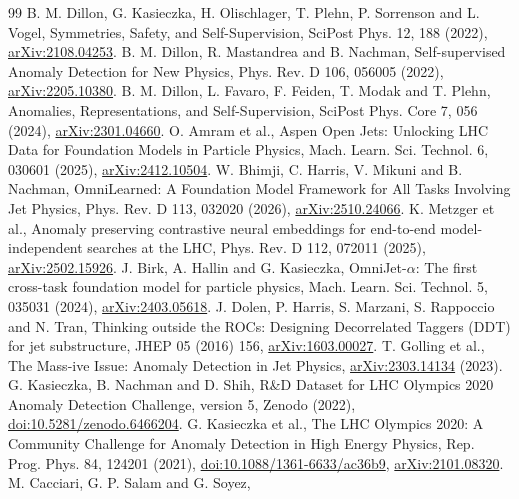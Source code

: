 \begin{thebibliography}{99}
 B. M. Dillon, G. Kasieczka, H. Olischlager, T. Plehn, P. Sorrenson and L. Vogel,
Symmetries, Safety, and Self-Supervision, SciPost Phys. 12, 188 (2022),
\href{https://arxiv.org/abs/2108.04253}{arXiv:2108.04253}.
 B. M. Dillon, R. Mastandrea and B. Nachman,
Self-supervised Anomaly Detection for New Physics, Phys. Rev. D 106, 056005 (2022),
\href{https://arxiv.org/abs/2205.10380}{arXiv:2205.10380}.
 B. M. Dillon, L. Favaro, F. Feiden, T. Modak and T. Plehn,
Anomalies, Representations, and Self-Supervision, SciPost Phys. Core 7, 056 (2024),
\href{https://arxiv.org/abs/2301.04660}{arXiv:2301.04660}.
 O. Amram et al., Aspen Open Jets: Unlocking LHC Data for Foundation
Models in Particle Physics, Mach. Learn. Sci. Technol. 6, 030601 (2025),
\href{https://arxiv.org/abs/2412.10504}{arXiv:2412.10504}.
 W. Bhimji, C. Harris, V. Mikuni and B. Nachman,
OmniLearned: A Foundation Model Framework for All Tasks Involving Jet Physics,
Phys. Rev. D 113, 032020 (2026),
\href{https://arxiv.org/abs/2510.24066}{arXiv:2510.24066}.
 K. Metzger et al., Anomaly preserving contrastive neural embeddings
for end-to-end model-independent searches at the LHC,
Phys. Rev. D 112, 072011 (2025),
\href{https://arxiv.org/abs/2502.15926}{arXiv:2502.15926}.
 J. Birk, A. Hallin and G. Kasieczka,
OmniJet-$\alpha$: The first cross-task foundation model for particle physics,
Mach. Learn. Sci. Technol. 5, 035031 (2024),
\href{https://arxiv.org/abs/2403.05618}{arXiv:2403.05618}.
 J. Dolen, P. Harris, S. Marzani, S. Rappoccio and N. Tran,
Thinking outside the ROCs: Designing Decorrelated Taggers (DDT) for jet
substructure, JHEP 05 (2016) 156,
\href{https://arxiv.org/abs/1603.00027}{arXiv:1603.00027}.
 T. Golling et al., The Mass-ive Issue: Anomaly Detection in Jet Physics,
\href{https://arxiv.org/abs/2303.14134}{arXiv:2303.14134} (2023).
 G. Kasieczka, B. Nachman and D. Shih,
R\&D Dataset for LHC Olympics 2020 Anomaly Detection Challenge, version 5,
Zenodo (2022), \href{https://doi.org/10.5281/zenodo.6466204}{doi:10.5281/zenodo.6466204}.
 G. Kasieczka et al., The LHC Olympics 2020: A Community
Challenge for Anomaly Detection in High Energy Physics,
Rep. Prog. Phys. 84, 124201 (2021),
\href{https://doi.org/10.1088/1361-6633/ac36b9}{doi:10.1088/1361-6633/ac36b9},
\href{https://arxiv.org/abs/2101.08320}{arXiv:2101.08320}.
 M. Cacciari, G. P. Salam and G. Soyez,

\end{thebibliography}
